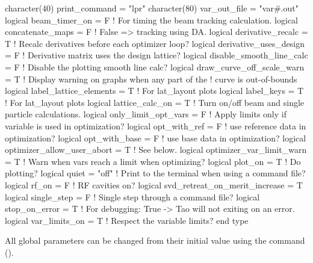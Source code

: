 {{{{{{{\begin{example}
  character(40)  print_command = "lpr"
  character(80)  var_out_file  = "var#.out"
  logical beam_timer_on = F               ! For timing the beam tracking calculation.
  logical concatenate_maps = F           ! False => tracking using DA.
  logical derivative_recalc = T          ! Recalc derivatives before each optimizer loop?
  logical derivative_uses_design = F     ! Derivative matrix uses the design lattice?
  logical disable_smooth_line_calc = F   ! Disable the plotting smooth line calc?
  logical draw_curve_off_scale_warn = T  ! Display warning on graphs when any part of the 
                                         !   curve is out-of-bounds
  logical label_lattice_elements = T     ! For lat_layout plots
  logical label_keys = T                 ! For lat_layout plots
  logical lattice_calc_on = T            ! Turn on/off beam and single particle calculations.
  logical only_limit_opt_vars = F        ! Apply limits only if variable is used in optimization?
  logical opt_with_ref = F               ! use reference data in optimization?
  logical opt_with_base = F              ! use base data in optimization?
  logical optimizer_allow_user_abort = T ! See below.
  logical optimizer_var_limit_warn = T   ! Warn when vars reach a limit when optimizing?
  logical plot_on = T                    ! Do plotting?
  logical quiet = "off"                  ! Print to the terminal when using a command file?
  logical rf_on = F                      ! RF cavities on?
  logical svd_retreat_on_merit_increase = T    
  logical single_step = F                ! Single step through a command file?
  logical stop_on_error = T              ! For debugging: True -> Tao will not exiting on an error.
  logical var_limits_on = T              ! Respect the variable limits?
end type
\end{example}

All global parameters can be changed from their initial value using
the  command ().

  \begin{description}
  \item{\vn{global%
When constructing transfer Taylor maps the default method, used with \vn{global%
False, is to use Differential Algebra (DA) to integrate the map from the starting point to the
ending point.  Alternatively, with \vn{global%
integration region has an associated map, that map is concatenated with the map under construction.
This saves time but the potential drawback is a loss of accuracy. Note that a lattice element
will only have an associate map if the \vn{tracking_method} or \vn{make_mat6_method} components
of the lattice element are such that a map is needed for tracking (see the \bmad manual for more
details).

}}}}
\end{description}}}}}}}}

